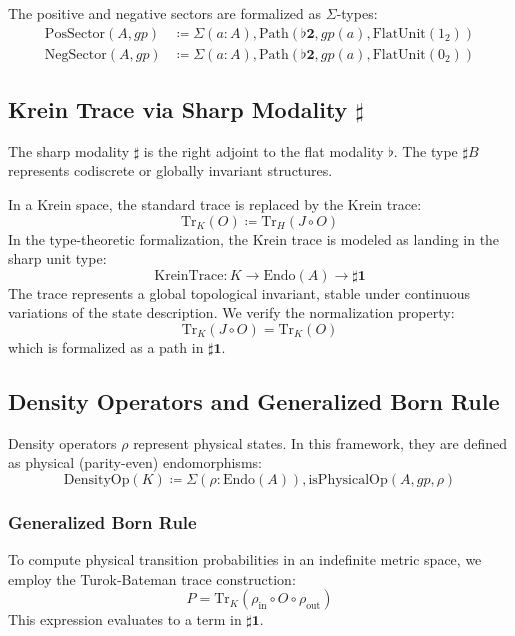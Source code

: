 \documentclass{article}
\begin{document}
The positive and negative sectors are formalized as $\Sigma$-types:
\begin{align}
    \text{PosSector}(A, gp) &\coloneqq \Sigma(a:A), \text{Path}(\flat\mathbf{2}, gp(a), \text{FlatUnit}(1_2)) \\
    \text{NegSector}(A, gp) &\coloneqq \Sigma(a:A), \text{Path}(\flat\mathbf{2}, gp(a), \text{FlatUnit}(0_2))
\end{align}

\subsection{Krein Trace via Sharp Modality $\sharp$}
\label{sec:trace}

The sharp modality $\sharp$ is the right adjoint to the flat modality $\flat$. The type $\sharp B$ represents codiscrete or globally invariant structures.

In a Krein space, the standard trace is replaced by the Krein trace:
\begin{equation}
    \text{Tr}_K(O) \coloneqq \text{Tr}_H(J \circ O)
\end{equation}
In the type-theoretic formalization, the Krein trace is modeled as landing in the sharp unit type:
\begin{equation}
    \text{KreinTrace} : K \to \text{Endo}(A) \to \sharp \mathbf{1}
\end{equation}
The trace represents a global topological invariant, stable under continuous variations of the state description. We verify the normalization property:
\begin{equation}
    \text{Tr}_K(J \circ O) = \text{Tr}_K(O)
\end{equation}
which is formalized as a path in $\sharp \mathbf{1}$.

\subsection{Density Operators and Generalized Born Rule}
\label{sec:born}

Density operators $\rho$ represent physical states. In this framework, they are defined as physical (parity-even) endomorphisms:
\begin{equation}
    \text{DensityOp}(K) \coloneqq \Sigma(\rho : \text{Endo}(A)), \text{isPhysicalOp}(A, gp, \rho)
\end{equation}

\subsubsection{Generalized Born Rule}
To compute physical transition probabilities in an indefinite metric space, we employ the Turok-Bateman trace construction:
\begin{equation}
    P = \text{Tr}_K(\rho_{\text{in}} \circ O \circ \rho_{\text{out}})
\end{equation}
This expression evaluates to a term in $\sharp \mathbf{1}$.
\end{document}
